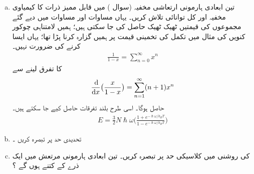 \begin{enumerate}[a.]
\item
تین ابعادی ہارمونی ارتعاشی مخفیہ  (سوال ) میں   قابل ممیز ذرات کا کیمیاوی مخفیہ اور کل توانائی تلاش کریں۔  یہاں مساوات    اور مساوات     میں دیے گئے مجموعوں کی قیمتیں ٹھیک ٹھیک حاصل کی جا سکتی ہیں؛ ہمیں لامتناہی چوکور کنویں  کی مثال میں تکمل کی تخمینی قیمت پر ہمیں گزارہ کرنا پڑا تھا؛ یہاں ایسا کرنے کی ضرورت نہیں۔  
\begin{align}
\frac{1}{1 - x} = \sum_{n = 0}^{\infty} x^{n}
\end{align}
کا تفرق لینے سے 
\begin{align*}
\frac{\dif}{\dif x} \big ( \frac{x}{1 - x} \big ) = \sum_{n = 1}^{\infty} (n + 1) x^{n}
\end{align*}
حاصل ہوگا۔ اسی طرح بلند تفرقات حاصل کیے جا سکتے ہیں۔  
\begin{align}
E = \frac{3}{2} N \hslash \omega \big ( \frac{1 + e^{- \hslash \omega / k_B T}}{1 - e^{- \hslash \omega / k_B T}} \big )
\end{align}
\item
تحدیدی حد  پر تبصرہ کریں ۔
\item
{}  کی روشنی میں کلاسیکی حد  پر تبصرہ کریں۔ تین ابعادی  ہارمونی مرتعش میں ایک ذرے کے  کتنے ہوں گے ؟
\end{enumerate}

